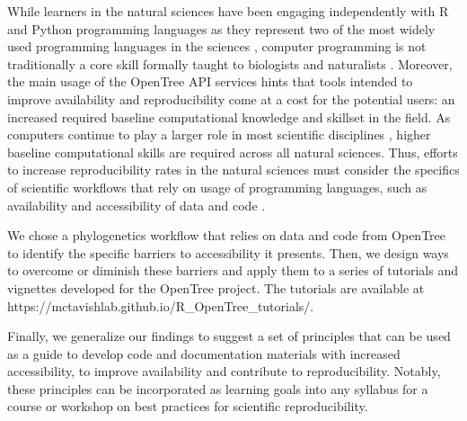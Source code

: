 \documentclass[12pt]{article}
\begin{document}
While learners in the natural sciences have been engaging independently with R
and Python programming languages
as they represent two of the most widely used programming languages in the sciences
\citep{baker2017scientific}, computer programming is not traditionally
a core skill formally taught to biologists and naturalists
\citep{sayres2018bioinformatics, wright2019the, williams2019barriers}.
Moreover, the main usage of the OpenTree API services hints that tools intended to
improve availability and reproducibility come at a cost for the potential users:
 an increased required baseline computational knowledge and skillset
in the field.
As computers continue to play a larger role in most scientific disciplines \citep{piccolo2016tools},
higher baseline computational skills are required across all natural sciences.
Thus, efforts to increase reproducibility rates in the natural sciences must consider
the specifics of scientific workflows that rely on usage of programming languages, such as
availability and accessibility of data and code \citep{peng2011reproducible, sandve2013ten, powers2019open}.

We chose a phylogenetics workflow that relies on data and code from OpenTree to
identify the specific barriers to accessibility it presents.
Then, we design ways to overcome or diminish these barriers and apply them to
a series of tutorials and vignettes developed for the OpenTree project.
The tutorials are available at https://mctavishlab.github.io/R\_OpenTree\_tutorials/.

Finally, we generalize our findings to suggest a set of
principles that can be used as a guide to develop code and documentation materials
with increased accessibility, to improve availability and contribute to reproducibility.
Notably, these principles can be incorporated as learning goals into any syllabus for a
course or workshop on best practices for scientific reproducibility.
\end{document}

